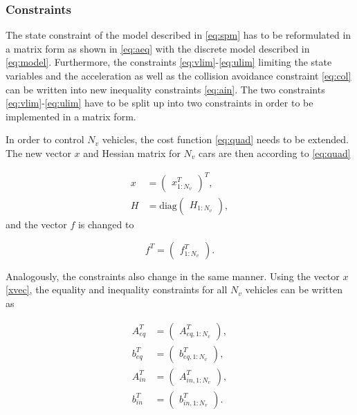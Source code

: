 \documentclass[letterpaper,10pt,conference]{ieeeconf}
\begin{document}
\subsubsection{Constraints}
The state constraint of the model described in \eqref{eq:spm} has to be reformulated in a matrix form as shown in \eqref{eq:aeq} with the discrete model described in \eqref{eq:model}. Furthermore, the constraints \eqref{eq:vlim}-\eqref{eq:ulim} limiting the state variables and the acceleration as well as the collision avoidance constraint \eqref{eq:col} can be written into new inequality constraints \eqref{eq:ain}. The two constraints \eqref{eq:vlim}-\eqref{eq:ulim} have to be split up into two constraints in order to be implemented in a matrix form.

In order to control $N_v$ vehicles, the cost function \eqref{eq:quad} needs to be extended. The new vector $x$ and Hessian matrix for $N_v$ cars are then according to \eqref{eq:quad}

\begin{align}
x &=\begin{pmatrix}
x_{1:N_v}^T
\end{pmatrix}^T,\label{xvec}\\
H &= \text{diag}\begin{pmatrix}H_{1:N_v}\end{pmatrix},
\end{align}
and the vector $f$ is changed to

\begin{equation}
f^T =
\begin{pmatrix}
f^T_{1:N_v}
\end{pmatrix}.
\end{equation}

Analogously, the constraints also change in the same manner. Using the vector $x$ \eqref{xvec}, the equality and inequality constraints for all $N_v$ vehicles can be written as

\begin{align}
A_{eq}^T&=
\begin{pmatrix}
    A_{eq,1:N_v}^T
    \end{pmatrix},\\
    b_{eq}^T&=\begin{pmatrix}
    b_{eq,1:N_v}^T
    \end{pmatrix}, \\
A_{in}^T&=
\begin{pmatrix}
    A_{in,1:N_v}^T
    \end{pmatrix},\\
    b_{in}^T&=\begin{pmatrix}
    b_{in,1:N_v}^T
    \end{pmatrix}.
\end{align}
\end{document}

